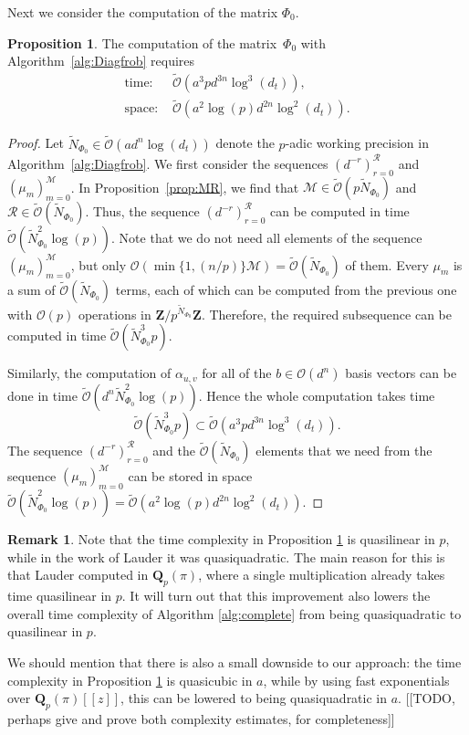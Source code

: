 \documentclass[a4paper,11pt]{article}
\numberwithin{equation}{section}
\newcommand{\ZZ}{\mathbf{Z}} %
\newcommand{\QQ}{\mathbf{Q}} %
\providecommand{\BigOh}{\mathcal{O}}          %
\providecommand{\SoftOh}{\tilde{\mathcal{O}}} %
\theoremstyle{definition}
\newtheorem{prop}[thm]{Proposition}
\newtheorem{rem}[thm]{Remark}
\begin{document}
Next we consider the computation of the matrix $\Phi_0$.

\begin{prop} \label{prop:complexityPhi0}
The computation of the matrix~$\Phi_0$ with Algorithm~\ref{alg:Diagfrob} requires
\begin{align*}
\mbox{time: }  &\SoftOh(a^3 p d^{3n} \log^3(d_t)), \\
\mbox{space: } &\SoftOh(a^2 \log(p) d^{2n} \log^2(d_t)).
\end{align*}
\end{prop}

\begin{proof}
Let $\tilde{N}_{\Phi_0} \in \SoftOh(a d^n \log(d_t))$ denote the $p$-adic working
precision in Algorithm~\ref{alg:Diagfrob}.  We first consider the 
sequences $(d^{-r})_{r=0}^{\mathcal{R}}$ and $(\mu_m)_{m=0}^{\mathcal{M}}$. 
In Proposition~\ref{prop:MR}, we find that 
$\mathcal{M} \in \SoftOh(p \tilde{N}_{\Phi_0})$ and 
$\mathcal{R} \in \SoftOh(\tilde{N}_{\Phi_0})$.  Thus, the sequence 
$(d^{-r})_{r=0}^{\mathcal{R}}$ can be computed in time 
$\SoftOh(\tilde{N}_{\Phi_0}^2 \log(p))$.  Note that we do not 
need all elements of the sequence $( \mu_{m} )_{m=0}^{\mathcal{M}}$, but only 
$\BigOh( \min \{ 1,(n/p) \} \mathcal{M} ) = \SoftOh(\tilde{N}_{\Phi_0})$ of 
them.  Every $\mu_m$ is a sum of $\SoftOh(\tilde{N}_{\Phi_0})$ terms, each of 
which can be computed from the previous one with $\BigOh(p)$ operations in 
$\ZZ/p^{\tilde{N}_{\Phi_0}}\ZZ$.  Therefore, the required subsequence can be computed 
in time $\SoftOh(\tilde{N}_{\Phi_0}^3 p)$.

Similarly, the computation of $\alpha_{u,v}$ for all of the 
$b \in \BigOh(d^n)$ basis vectors can be done in time 
$\SoftOh(d^n \tilde{N}_{\Phi_0}^2 \log(p))$.  Hence the whole computation 
takes time 
\[
\SoftOh(\tilde{N}_{\Phi_0}^3p) \subset \SoftOh(a^3 p d^{3n} \log^3(d_t)).
\]
The sequence $(d^{-r})_{r=0}^{\mathcal{R}}$ and the 
$\SoftOh(\tilde{N}_{\Phi_0})$ elements that we need from the sequence 
$(\mu_{m})_{m=0}^{\mathcal{M}}$ can be stored in space 
$\SoftOh(\tilde{N}_{\Phi_0}^2 \log(p)) = \SoftOh(a^2 \log(p) d^{2n} \log^2(d_t))$.
\end{proof}

\begin{rem}
Note that the time complexity in Proposition \ref{prop:complexityPhi0} 
is quasilinear in $p$, while in the work of Lauder \cite{Lauder2004a} 
it was quasiquadratic. The main reason for this is that Lauder computed 
in $\QQ_p(\pi)$, where a single multiplication already takes time 
quasilinear in $p$. It will turn out that this improvement also lowers
the overall time complexity of Algorithm \ref{alg:complete} from
being quasiquadratic to quasilinear in $p$. 

We should mention that there is also a small downside to our approach:  
the time complexity in Proposition \ref{prop:complexityPhi0} is quasicubic 
in $a$, while by using fast exponentials over $\QQ_p(\pi)[[z]]$, this can 
be lowered to being quasiquadratic in $a$. [[TODO, perhaps give and prove 
both complexity estimates, for completeness]]
\end{rem}
\end{document}

